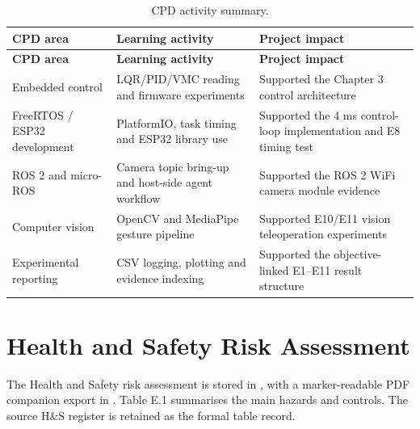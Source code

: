 \documentclass[12pt, a4paper]{article}
\begin{document}
\begingroup
\singlespacing
\small
\setlength{\tabcolsep}{2pt}
\renewcommand{\arraystretch}{1.15}
\begin{longtable}{>{\RaggedRight\arraybackslash}p{}>{\RaggedRight\arraybackslash}p{}>{\RaggedRight\arraybackslash}p{}}
\caption{CPD activity summary.}\\
\toprule
\textbf{CPD area} & \textbf{Learning activity} & \textbf{Project impact} \\
\midrule
\endfirsthead
\toprule
\textbf{CPD area} & \textbf{Learning activity} & \textbf{Project impact} \\
\midrule
\endhead
Embedded control & LQR/PID/VMC reading and firmware experiments & Supported the Chapter 3 control architecture \\
FreeRTOS / ESP32 development & PlatformIO, task timing and ESP32 library use & Supported the 4 ms control-loop implementation and E8 timing test \\
ROS 2 and micro-ROS & Camera topic bring-up and host-side agent workflow & Supported the ROS 2 WiFi camera module evidence \\
Computer vision & OpenCV and MediaPipe gesture pipeline & Supported E10/E11 vision teleoperation experiments \\
Experimental reporting & CSV logging, plotting and evidence indexing & Supported the objective-linked E1--E11 result structure \\
\bottomrule
\end{longtable}
\endgroup

\section{Health and Safety Risk Assessment}
The Health and Safety risk assessment is stored in , with a marker-readable PDF companion export in . Table E.1 summarises the main hazards and controls. The source H\&S register is retained as the formal table record.
\end{document}

